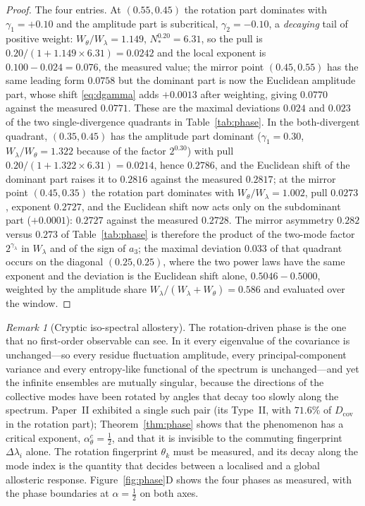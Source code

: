 \documentclass[11pt,reqno]{amsart}
\theoremstyle{plain}
\theoremstyle{definition}
\theoremstyle{remark}
\newtheorem{remark}[theorem]{Remark}
\numberwithin{equation}{section}
\newcommand{\Dcov}{D_{\mathrm{cov}}}
\begin{document}
\begin{proof}
The four entries. At $(0.55,0.45)$ the rotation part dominates with $\gamma_1=+0.10$ and the amplitude part is subcritical, $\gamma_2=-0.10$, a \emph{decaying} tail of positive weight: $W_\theta/W_\lambda=1.149$, $N_*^{0.20}=6.31$, so the pull is $0.20/(1+1.149\times6.31)=0.0242$ and the local exponent is $0.100-0.024=0.076$, the measured value; the mirror point $(0.45,0.55)$ has the same leading form $0.0758$ but the dominant part is now the Euclidean amplitude part, whose shift \eqref{eq:dgamma} adds $+0.0013$ after weighting, giving $0.0770$ against the measured $0.0771$. These are the maximal deviations $0.024$ and $0.023$ of the two single-divergence quadrants in Table~\ref{tab:phase}. In the both-divergent quadrant, $(0.35,0.45)$ has the amplitude part dominant ($\gamma_1=0.30$, $W_\lambda/W_\theta=1.322$ because of the factor $2^{0.30}$) with pull $0.20/(1+1.322\times6.31)=0.0214$, hence $0.2786$, and the Euclidean shift of the dominant part raises it to $0.2816$ against the measured $0.2817$; at the mirror point $(0.45,0.35)$ the rotation part dominates with $W_\theta/W_\lambda=1.002$, pull $0.0273$, exponent $0.2727$, and the Euclidean shift now acts only on the subdominant part ($+0.0001$): $0.2727$ against the measured $0.2728$. The mirror asymmetry $0.282$ versus $0.273$ of Table~\ref{tab:phase} is therefore the product of the two-mode factor $2^{\gamma_\lambda}$ in $W_\lambda$ and of the sign of $a_3$; the maximal deviation $0.033$ of that quadrant occurs on the diagonal $(0.25,0.25)$, where the two power laws have the same exponent and the deviation is the Euclidean shift alone, $0.5046-0.5000$, weighted by the amplitude share $W_\lambda/(W_\lambda+W_\theta)=0.586$ and evaluated over the window.
\end{proof}

\begin{remark}[Cryptic iso-spectral allostery]
The rotation-driven phase is the one that no first-order observable can see. In it every eigenvalue of the covariance is unchanged---so every residue fluctuation amplitude, every principal-component variance and every entropy-like functional of the spectrum is unchanged---and yet the infinite ensembles are mutually singular, because the directions of the collective modes have been rotated by angles that decay too slowly along the spectrum. Paper~II exhibited a single such pair (its Type~II, with $71.6\%$ of $\Dcov$ in the rotation part); Theorem~\ref{thm:phase} shows that the phenomenon has a critical exponent, $\alpha_\theta^c=\tfrac12$, and that it is invisible to the commuting fingerprint $\Delta\lambda_i$ alone. The rotation fingerprint $\theta_k$ must be measured, and its decay along the mode index is the quantity that decides between a localised and a global allosteric response. Figure~\ref{fig:phase}D shows the four phases as measured, with the phase boundaries at $\alpha=\tfrac12$ on both axes.
\end{remark}
\end{document}
